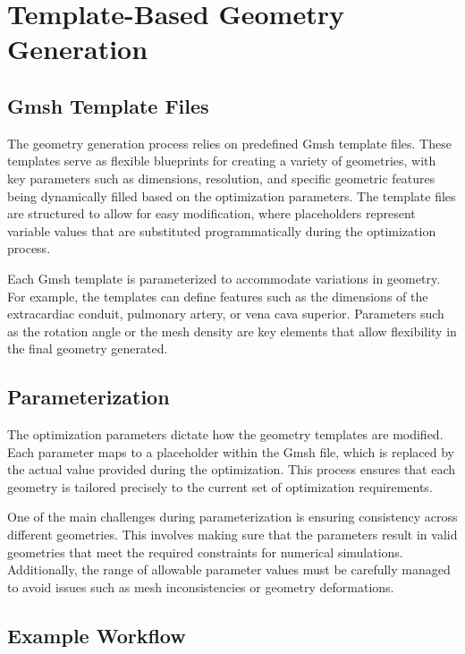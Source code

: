 \section{Template-Based Geometry Generation}

\subsection{Gmsh Template Files}

The geometry generation process relies on predefined Gmsh template files. These templates serve as flexible blueprints for creating a variety of geometries, with key parameters such as dimensions, resolution, and specific geometric features being dynamically filled based on the optimization parameters. The template files are structured to allow for easy modification, where placeholders represent variable values that are substituted programmatically during the optimization process.


Each Gmsh template is parameterized to accommodate variations in geometry. For example, the templates can define features such as the dimensions of the extracardiac conduit, pulmonary artery, or vena cava superior. Parameters such as the rotation angle or the mesh density are key elements that allow flexibility in the final geometry generated.

\subsection{Parameterization}

The optimization parameters dictate how the geometry templates are modified. Each parameter maps to a placeholder within the Gmsh file, which is replaced by the actual value provided during the optimization. This process ensures that each geometry is tailored precisely to the current set of optimization requirements.

One of the main challenges during parameterization is ensuring consistency across different geometries. This involves making sure that the parameters result in valid geometries that meet the required constraints for numerical simulations. Additionally, the range of allowable parameter values must be carefully managed to avoid issues such as mesh inconsistencies or geometry deformations.

\subsection{Example Workflow}

